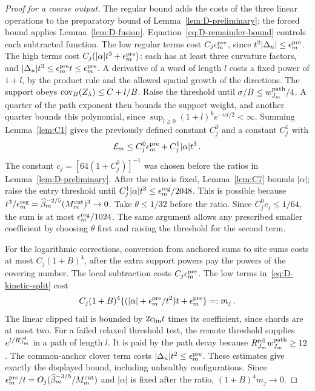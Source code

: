 \begin{proof}[Proof for a coarse output]
The regular bound adds the costs of the three linear operations to the preparatory bound of Lemma~\ref{lem:D-preliminary}; the forced bound applies Lemma~\ref{lem:D-fusion}. Equation~\eqref{eq:D-remainder-bound} controls each subtracted function. The low regular terms cost $C_j\epsilon^{\rm pre}_m$, since $t^2|\Delta_u|\le \epsilon^{\rm pre}_m$. The high terms cost $C_j(|\alpha|t^3+\epsilon^{\rm pre}_m)$: each has at least three curvature factors, and $|\Delta_u|t^3\le \epsilon^{\rm pre}_mt\le \epsilon^{\rm pre}_m$. A derivative of a word of length $l$ costs a fixed power of $1+l$, by the product rule and the allowed spatial growth of the directions. The support obeys $\operatorname{cov}_B(Z_\lambda)\le C+l/B$. Raise the threshold until $\sigma/B\le w^{\rm path}_{J_m}/4$. A quarter of the path exponent then bounds the support weight, and another quarter bounds this polynomial, since $\sup_{l\ge0}(1+l)^ke^{-wl/2}<\infty$. Summing Lemma~\ref{lem:C1} gives the previously defined constant $C_j^0$ and a constant $C_j^1$ with
\begin{equation*}
\mathcal E_m\le C_j^0\epsilon^{\rm pre}_m+C_j^1|\alpha|t^3\,.
\end{equation*}
The constant $c_j=[64(1+C_j^0)]^{-1}$ was chosen before the ratios in Lemma~\ref{lem:D-preliminary}. After the ratio is fixed, Lemma~\ref{lem:C7} bounds $|\alpha|$; raise the entry threshold until $C_j^1|\alpha|t^3\le\epsilon_m^{\rm reg}/2048$. This is possible because $t^3/\epsilon_m^{\rm reg}=\widehat{\beta}_m^{-2/5}(M^{\mathrm{cut}}_m)^3\to0$. Take $\theta\le1/32$ before the ratio. Since $C_j^0c_j\le1/64$, the sum is at most $\epsilon_m^{\rm reg}/1024$. The same argument allows any prescribed smaller coefficient by choosing $\theta$ first and raising the threshold for the second term.

For the logarithmic corrections, conversion from anchored sums to site sums costs at most $C_j(1+B)^4$, after the extra support powers pay the powers of the covering number. The local subtraction costs $C_j\epsilon^{\rm pre}_m$. The low terms in~\eqref{eq:D-kinetic-split} cost
\begin{equation*}
C_j(1+B)^4\{(|\alpha|+\epsilon^{\rm pre}_m/t^2)t+\epsilon^{\rm pre}_m\}=:m_j\,.
\end{equation*}
The linear clipped tail is bounded by $2c_{\rm lin}t$ times its coefficient, since chords are at most two. For a failed relaxed threshold test, the remote threshold supplies $e^{l/R_{J_m}^{\rm rel}}$ in a path of length $l$. It is paid by the path decay because $R_{J_m}^{\rm rel}w_{J_m}^{\rm path}\ge12$. The common-anchor clover term costs $|\Delta_u|t^2\le \epsilon^{\rm pre}_m$. These estimates give exactly the displayed bound, including unhealthy configurations. Since $\epsilon^{\rm pre}_m/t=O_j(\widehat{\beta}_m^{-3/5}/M^{\mathrm{cut}}_m)$ and $|\alpha|$ is fixed after the ratio, $(1+B)^4m_j\to0$.


\end{proof}
